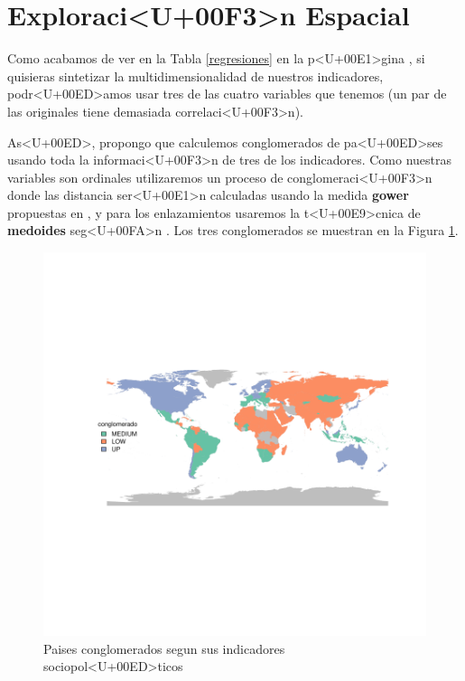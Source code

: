 \clearpage

\section{Exploraci<U+00F3>n Espacial}

Como acabamos de ver en la Tabla \ref{regresiones} en la p<U+00E1>gina \pageref{regresiones}, si quisieras sintetizar la multidimensionalidad de nuestros indicadores, podr<U+00ED>amos usar tres de las cuatro variables que tenemos (un par de las originales tiene demasiada correlaci<U+00F3>n). 

As<U+00ED>, propongo que calculemos conglomerados de pa<U+00ED>ses usando toda la informaci<U+00F3>n de tres de los indicadores. Como nuestras variables son ordinales utilizaremos un proceso de conglomeraci<U+00F3>n donde las distancia ser<U+00E1>n calculadas usando la medida {\bf gower} propuestas en \cite{gower_general_1971}, y para los enlazamientos usaremos la t<U+00E9>cnica de {\bf medoides} seg<U+00FA>n \cite{reynolds_clustering_2006}. Los tres conglomerados se muestran en la Figura \ref{clustmap}.






\begin{figure}[h]
\centering
\begin{adjustbox}{width=11cm,height=8cm,clip,trim=1cm 2.5cm 0cm 2.5cm}
\includegraphics{paperVersion_7_regresion-plotMap1}
\end{adjustbox}
\caption{Paises conglomerados segun sus indicadores sociopol<U+00ED>ticos}\label{clustmap}
\end{figure}



\endinput
